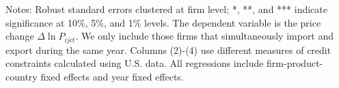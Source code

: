 \begin{table}
\begin{threeparttable}
\begin{tabular}{lcccccccc}
			\bottomrule
		\end{tabular}
		\begin{tablenotes}
			\footnotesize
			\item[Notes:] Robust standard errors clustered at firm level; *, **, and *** indicate significance at 10\%, 5\%, and 1\% levels. The dependent variable is the price change $\Delta \ln P_{ijct}$. We only include those firms that simultaneously import and export during the same year. Columns (2)-(4) use different measures of credit constraints calculated using U.S. data. All regressions include firm-product-country fixed effects and year fixed effects.
		\end{tablenotes}
	\end{threeparttable}
	\label{tab.robust.tradetype}
\end{table}

